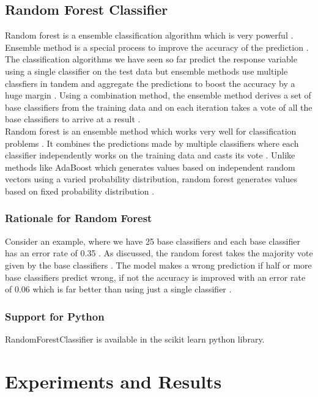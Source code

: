 \documentclass[sigconf]{acmart}
\begin{document}
\subsection{Random Forest Classifier}
Random forest is a ensemble classification algorithm which is very powerful \cite{book-tan}. Ensemble method is a special process to improve the accuracy of the prediction \cite{book-tan}. The classification algorithms we have seen so far predict the response variable using a single classifier on the test data but ensemble methods use multiple classfiers in tandem and aggregate the predictions to boost the accuracy by a huge margin \cite{book-tan}. Using a combination method, the ensemble method derives a set of base classifiers from the training data and on each iteration takes a vote of all the base classifiers to arrive at a result \cite{book-tan}. \\

Random forest is an ensemble method which works very well for classification problems \cite{book-tan}. It combines the predictions made by multiple classifiers where each classifier independently works on the training data and casts its vote \cite{book-tan}. Unlike methods like AdaBoost which generates values based on independent random vectors using a varied probability distribution, random forest generates values based on fixed probability distribution \cite{book-tan}. 

\subsubsection{Rationale for Random Forest}
Consider an example, where we have 25 base classifiers and each base classifier has an error rate of 0.35 \cite{book-tan}. As discussed, the random forest takes the majority vote given by the base classifiers \cite{book-tan}. The model makes a wrong prediction if half or more base classifiers predict wrong, if not the accuracy is improved with an error rate of 0.06 which is far better than using just a single classifier \cite{book-tan}.

\subsubsection{Support for Python} RandomForestClassifier is available in the scikit learn python library.

\section {Experiments and Results}
\end{document}
